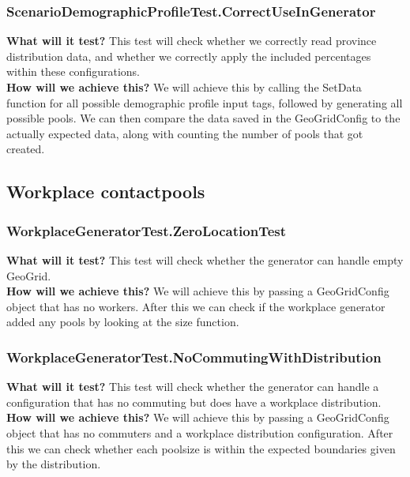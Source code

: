 \documentclass{article}
\begin{document}
\subsubsection{ScenarioDemographicProfileTest.CorrectUseInGenerator}
\textbf{What will it test?} 
This test will check whether we correctly read province distribution data, and whether we correctly apply the included percentages within these configurations. \\
\newline
\textbf{How will we achieve this?}
We will achieve this by calling the SetData function for all possible demographic profile input tags, followed by generating all possible pools. We can then compare the data saved in the GeoGridConfig to the actually expected data, along with counting the number of pools that got created.

\subsection{Workplace contactpools}

\subsubsection{WorkplaceGeneratorTest.ZeroLocationTest}
\textbf{What will it test?}
This test will check whether the generator can handle empty GeoGrid.\\
\newline
\textbf{How will we achieve this?}
We will achieve this by passing a GeoGridConfig object that has no workers. After this we can check if the workplace generator added any pools by looking at the size function.

\subsubsection{WorkplaceGeneratorTest.NoCommutingWithDistribution}
\textbf{What will it test?}
This test will check whether the generator can handle a configuration that has no commuting but does have a workplace distribution.\\
\newline
\textbf{How will we achieve this?}
We will achieve this by passing a GeoGridConfig object that has no commuters and a workplace distribution configuration. After this we can check whether each poolsize is within the expected boundaries given by the distribution.

\newpage
\end{document}
